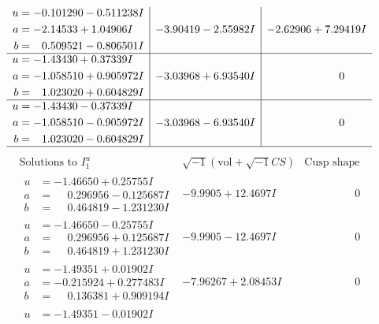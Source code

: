 \documentclass[1p]{elsarticle_modified}
\theoremstyle{definition}
\newcommand{\I}{\sqrt{-1}}
\begin{document}
$$\begin{array}{c|c|c}
\begin{aligned}
u &= -0.101290 - 0.511238 I \\
a &= -2.14533 + 1.04906 I \\
b &= \phantom{-}0.509521 - 0.806501 I\end{aligned}
 & -3.90419 - 2.55982 I & -2.62906 + 7.29419 I \\ \hline\begin{aligned}
u &= -1.43430 + 0.37339 I \\
a &= -1.058510 + 0.905972 I \\
b &= \phantom{-}1.023020 + 0.604829 I\end{aligned}
 & -3.03968 + 6.93540 I & \phantom{-0.000000 } 0 \\ \hline\begin{aligned}
u &= -1.43430 - 0.37339 I \\
a &= -1.058510 - 0.905972 I \\
b &= \phantom{-}1.023020 - 0.604829 I\end{aligned}
 & -3.03968 - 6.93540 I & \phantom{-0.000000 } 0\\
 \hline 
 \end{array}$$\newpage$$\begin{array}{c|c|c}  
\text{Solutions to }I^u_{1}& \I (\text{vol} + \sqrt{-1}CS) & \text{Cusp shape}\\
 \hline 
\begin{aligned}
u &= -1.46650 + 0.25755 I \\
a &= \phantom{-}0.296956 - 0.125687 I \\
b &= \phantom{-}0.464819 - 1.231230 I\end{aligned}
 & -9.9905 + 12.4697 I & \phantom{-0.000000 } 0 \\ \hline\begin{aligned}
u &= -1.46650 - 0.25755 I \\
a &= \phantom{-}0.296956 + 0.125687 I \\
b &= \phantom{-}0.464819 + 1.231230 I\end{aligned}
 & -9.9905 - 12.4697 I & \phantom{-0.000000 } 0 \\ \hline\begin{aligned}
u &= -1.49351 + 0.01902 I \\
a &= -0.215924 + 0.277483 I \\
b &= \phantom{-}0.136381 + 0.909194 I\end{aligned}
 & -7.96267 + 2.08453 I & \phantom{-0.000000 } 0 \\ \hline\begin{aligned}
u &= -1.49351 - 0.01902 I \\

\end{aligned}
\end{array}$$
\end{document}
